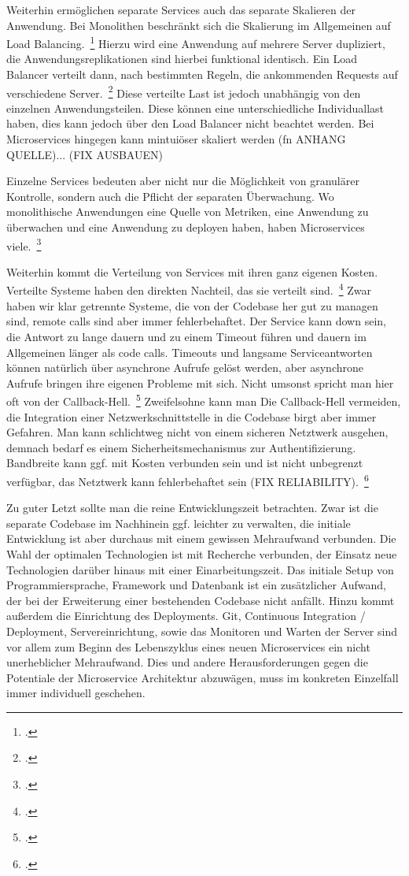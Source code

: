 Weiterhin ermöglichen separate Services auch das separate Skalieren der Anwendung. Bei Monolithen beschränkt sich die Skalierung im Allgemeinen auf Load Balancing.~\footcite[vgl.][]{infaktuell} Hierzu wird eine Anwendung auf mehrere Server dupliziert, die Anwendungsreplikationen sind hierbei funktional identisch. Ein Load Balancer verteilt dann, nach bestimmten Regeln, die ankommenden Requests auf verschiedene Server.~\footcite[vgl.][]{loadbalancing} Diese verteilte Last ist jedoch unabhängig von den einzelnen Anwendungsteilen. Diese können eine unterschiedliche Individuallast haben, dies kann jedoch über den Load Balancer nicht beachtet werden.
Bei Microservices hingegen kann mintuiöser skaliert werden (fn ANHANG QUELLE)... (FIX AUSBAUEN)

Einzelne Services bedeuten aber nicht nur die Möglichkeit von granulärer Kontrolle, sondern auch die Pflicht der separaten Überwachung. Wo monolithische Anwendungen eine Quelle von Metriken, eine Anwendung zu überwachen und eine Anwendung zu deployen haben, haben Microservices viele.~\footcite[vgl.][]{Heroku:GoMicro}

Weiterhin kommt die Verteilung von Services mit ihren ganz eigenen Kosten. Verteilte Systeme haben den direkten Nachteil, das sie verteilt sind.~\footcite[][]{microtradeoffs} Zwar haben wir klar getrennte Systeme, die von der Codebase her gut zu managen sind, remote calls sind aber immer fehlerbehaftet. Der Service kann down sein, die Antwort zu lange dauern und zu einem Timeout führen und dauern im Allgemeinen länger als code calls. Timeouts und langsame Serviceantworten können natürlich über asynchrone Aufrufe gelöst werden, aber asynchrone Aufrufe bringen ihre eigenen Probleme mit sich. Nicht umsonst spricht man hier oft von der Callback-Hell.~\footcite[vgl.][]{callbackhell} Zweifelsohne kann man Die Callback-Hell vermeiden, die Integration einer Netzwerkschnittstelle in die Codebase birgt aber immer Gefahren. Man kann schlichtweg nicht von einem sicheren Netztwerk ausgehen, demnach bedarf es einem Sicherheitsmechanismus zur Authentifizierung. Bandbreite kann ggf. mit Kosten verbunden sein und ist nicht unbegrenzt verfügbar, das Netztwerk kann fehlerbehaftet sein (FIX RELIABILITY).~\footcite[vgl.][]{distributedfallacies}

Zu guter Letzt sollte man die reine Entwicklungszeit betrachten. Zwar ist die separate Codebase im Nachhinein ggf. leichter zu verwalten, die initiale Entwicklung ist aber durchaus mit einem gewissen Mehraufwand verbunden. Die Wahl der optimalen Technologien ist mit Recherche verbunden, der Einsatz neue Technologien darüber hinaus mit einer Einarbeitungszeit. Das initiale Setup von Programmiersprache, Framework und Datenbank ist ein zusätzlicher Aufwand, der bei der Erweiterung einer bestehenden Codebase nicht anfällt. Hinzu kommt außerdem die Einrichtung des Deployments. Git, Continuous Integration / Deployment, Servereinrichtung, sowie das Monitoren und Warten der Server sind vor allem zum Beginn des Lebenszyklus eines neuen Microservices ein nicht unerheblicher Mehraufwand. Dies und andere Herausforderungen gegen die Potentiale der Microservice Architektur abzuwägen, muss im konkreten Einzelfall immer individuell geschehen.

